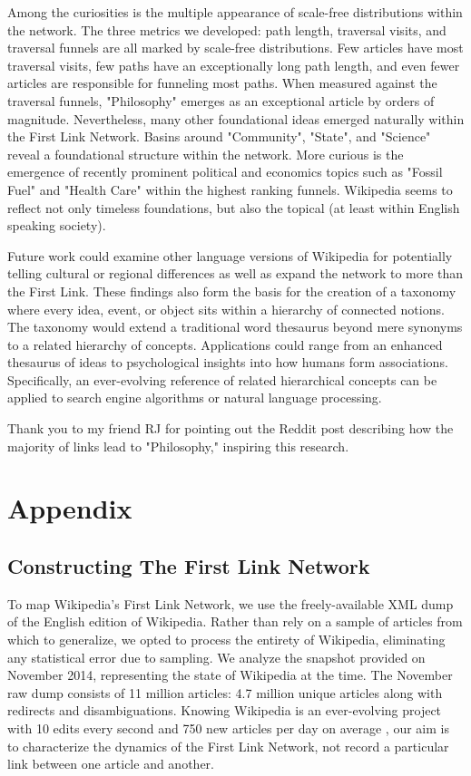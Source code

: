 \documentclass[pre,twocolumn,twoside,superscriptaddress,floatfix, aps, 10pt]{revtex4-1}
\begin{document}
Among the curiosities is the multiple appearance of scale-free distributions within the network. 
The three metrics we developed: path length, traversal visits, and traversal funnels are all marked 
by scale-free distributions. Few articles have most traversal visits, few paths have an exceptionally long path length, and even fewer
articles are responsible for funneling most paths. When measured against the traversal funnels, 
"Philosophy" emerges as an exceptional article by orders of magnitude. 
Nevertheless, many other foundational ideas emerged naturally within the First Link Network. 
Basins around "Community", "State", and "Science" reveal a foundational structure within the network. 
More curious is the emergence of recently prominent political and economics topics such as "Fossil Fuel" and "Health Care" 
within the highest ranking funnels. 
Wikipedia seems to reflect not only timeless foundations, but also the topical (at least within English speaking society).

Future work could examine other language versions of Wikipedia for potentially telling cultural or regional differences as well as expand the network to more than the First Link.
These findings also form the basis for the creation of a taxonomy where 
every idea, event, or object sits within a hierarchy of connected notions.
The taxonomy would extend a traditional word thesaurus beyond mere synonyms to a related hierarchy of concepts.
Applications could range from an enhanced thesaurus of ideas to psychological insights into how humans form associations.
Specifically, an ever-evolving reference of related hierarchical concepts can be applied to search engine algorithms 
or natural language processing.


\acknowledgments
Thank you to my friend RJ for pointing out the Reddit post 
\cite{reddit}
describing how the majority of links lead to "Philosophy," inspiring this research.


\newpage

\section{Appendix}

\subsection{Constructing The First Link Network}

To map Wikipedia's First Link Network, we use the freely-available XML dump of the English edition of Wikipedia. 
Rather than rely on a sample of articles from which to generalize, we opted to process the entirety of Wikipedia, 
eliminating any statistical error due to sampling.
We analyze the snapshot provided on November 2014, representing the state of Wikipedia at the time.
The November raw dump consists of 11 million articles: 4.7 million unique articles along with redirects
and disambiguations.
Knowing Wikipedia is an ever-evolving project with 10 edits every second and 750 new articles per day on average
\cite{wiki_edits},
our aim is to characterize the dynamics of the First Link Network, not record a particular link between one
article and another.
\end{document}
